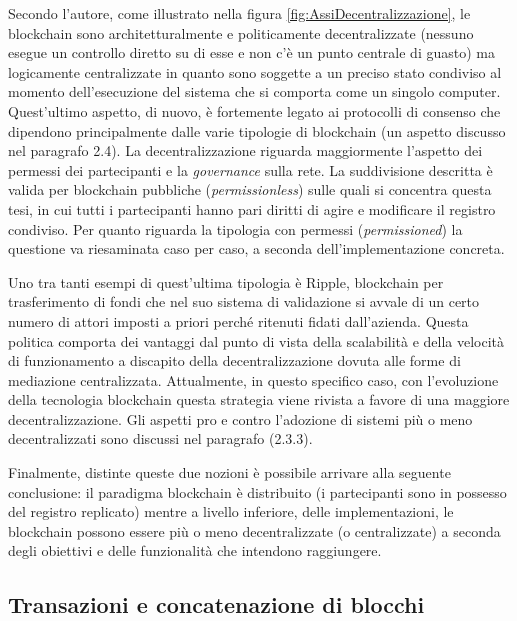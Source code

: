 Secondo l’autore, come illustrato nella figura \ref{fig:AssiDecentralizzazione}, le blockchain sono architetturalmente e politicamente decentralizzate (nessuno esegue un controllo diretto su di esse e non c’è un punto centrale di guasto) ma logicamente centralizzate in quanto sono soggette a un preciso stato condiviso al momento dell'esecuzione del sistema che si comporta come un singolo computer. Quest’ultimo aspetto, di nuovo, è fortemente legato ai protocolli di consenso che dipendono principalmente dalle varie tipologie di blockchain (un aspetto discusso nel paragrafo 2.4). La decentralizzazione riguarda maggiormente l’aspetto dei permessi dei partecipanti e la \emph{governance} sulla rete. La suddivisione descritta è valida per blockchain pubbliche (\emph{permissionless}) sulle quali si concentra questa tesi, in cui tutti i partecipanti hanno pari diritti di agire e modificare il registro condiviso. Per quanto riguarda la tipologia con permessi (\emph{permissioned}) la questione va riesaminata caso per caso, a seconda dell’implementazione concreta. 

Uno tra tanti esempi di quest’ultima tipologia è Ripple, blockchain per trasferimento di fondi che nel suo sistema di validazione si avvale di un certo numero di attori imposti a priori perché ritenuti fidati dall'azienda. Questa politica comporta dei vantaggi dal punto di vista della scalabilità e della velocità di funzionamento a discapito della decentralizzazione dovuta alle forme di mediazione centralizzata. Attualmente, in questo specifico caso, con l’evoluzione della tecnologia blockchain questa strategia viene rivista a favore di una maggiore decentralizzazione. Gli aspetti pro e contro l’adozione di sistemi più o meno decentralizzati sono discussi nel paragrafo (2.3.3).

Finalmente, distinte queste due nozioni è possibile arrivare alla seguente conclusione: il paradigma blockchain è distribuito (i partecipanti sono in possesso del registro replicato) mentre a livello inferiore, delle implementazioni, le blockchain possono essere più o meno decentralizzate (o centralizzate) a seconda degli obiettivi e delle funzionalità che intendono raggiungere.

\subsection{Transazioni e concatenazione di blocchi}

